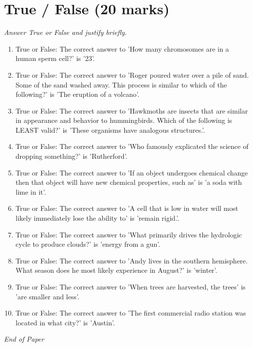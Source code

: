 \documentclass[12pt]{article}
\begin{document}
\section*{True / False (20 marks)}
\textit{Answer True or False and justify briefly.}
\begin{enumerate}[label=\arabic*.]
\item True or False: The correct answer to 'How many chromosomes are in a human sperm cell?' is '23'.
\item True or False: The correct answer to 'Roger poured water over a pile of sand. Some of the sand washed away. This process is similar to which of the following?' is 'The eruption of a volcano'.
\item True or False: The correct answer to 'Hawkmoths are insects that are similar in appearance and behavior to hummingbirds. Which of the following is LEAST valid?' is 'These organisms have analogous structures.'.
\item True or False: The correct answer to 'Who famously explicated the science of dropping something?' is 'Rutherford'.
\item True or False: The correct answer to 'If an object undergoes chemical change then that object will have new chemical properties, such as' is 'a soda with lime in it'.
\item True or False: The correct answer to 'A cell that is low in water will most likely immediately lose the ability to' is 'remain rigid.'.
\item True or False: The correct answer to 'What primarily drives the hydrologic cycle to produce clouds?' is 'energy from a gun'.
\item True or False: The correct answer to 'Andy lives in the southern hemisphere. What season does he most likely experience in August?' is 'winter'.
\item True or False: The correct answer to 'When trees are harvested, the trees' is 'are smaller and less'.
\item True or False: The correct answer to 'The first commercial radio station was located in what city?' is 'Austin'.
\end{enumerate}

\vfill
\noindent\textit{End of Paper}
\end{document}
